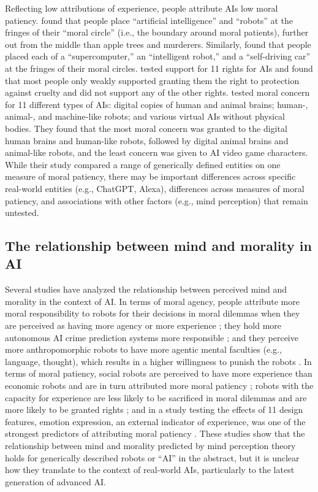 Reflecting low attributions of experience, people attribute AIs low moral patiency. \citet{pauketat22} found that people place “artificial intelligence” and “robots” at the fringes of their “moral circle” (i.e., the boundary around moral patients), further out from the middle than apple trees and murderers. Similarly, \citet{rottman21} found that people placed each of a “supercomputer,” an “intelligent robot,” and a “self-driving car” at the fringes of their moral circles. \citet{lima20} tested support for 11 rights for AIs and found that most people only weakly supported granting them the right to protection against cruelty and did not support any of the other rights. \citet{anthis24a} tested moral concern for 11 different types of AIs: digital copies of human and animal brains; human-, animal-, and machine-like robots; and various virtual AIs without physical bodies. They found that the most moral concern was granted to the digital human brains and human-like robots, followed by digital animal brains and animal-like robots, and the least concern was given to AI video game characters. While their study compared a range of generically defined entities on one measure of moral patiency, there may be important differences across specific real-world entities (e.g., ChatGPT, Alexa), differences across measures of moral patiency, and associations with other factors (e.g., mind perception) that remain untested.

\subsection{The relationship between mind and morality in AI}

Several studies have analyzed the relationship between perceived mind and morality in the context of AI. In terms of moral agency, people attribute more moral responsibility to robots for their decisions in moral dilemmas when they are perceived as having more agency or more experience \cite{nijssen22}; they hold more autonomous AI crime prediction systems more responsible \cite{hong19}; and they perceive more anthropomorphic robots to have more agentic mental faculties (e.g., language, thought), which results in a higher willingness to punish the robots \cite{yam22}. In terms of moral patiency, social robots are perceived to have more experience than economic robots and are in turn attributed more moral patiency \cite{stojilovic24, zhang21a, wang18}; robots with the capacity for experience are less likely to be sacrificed in moral dilemmas \cite{nijssen19} and are more likely to be granted rights \cite{tanibe17}; and in a study testing the effects of 11 design features, emotion expression, an external indicator of experience, was one of the strongest predictors of attributing moral patiency \cite{ladak24}. These studies show that the relationship between mind and morality predicted by mind perception theory \cite{gray12, gray12b} holds for generically described robots or “AI” in the abstract, but it is unclear how they translate to the context of real-world AIs, particularly to the latest generation of advanced AI.

